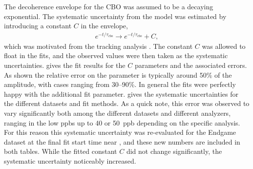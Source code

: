 The decoherence envelope for the CBO was assumed to be a decaying exponential. The systematic uncertainty from the model was estimated by introducing a constant $C$ in the envelope,
    \begin{align}
        e^{-t/\tau_{cbo}} \rightarrow e^{-t/\tau_{cbo}} + C,
    \end{align}
which was motivated from the tracking analysis \cite{phdthesis:2020Kinnaird}. The constant $C$ was allowed to float in the fits, and the observed \DR values were then taken as the systematic uncertainties.  gives the fit results for the $C$ parameters and the associated errors. As shown the relative error on the parameter is typically around 50\% of the amplitude, with cases ranging from 30--90\%. In general the fits were perfectly happy with the additional fit parameter.  gives the systematic uncertainties for the different datasets and fit methods. As a quick note, this error was observed to vary significantly both among the different datasets and different analyzers, ranging in the low ppbs up to 40 or 50~ppb depending on the specific analysis. For this reason this systematic uncertainty was re-evaluated for the Endgame dataset at the final fit start time near , and these new numbers are included in both tables. While the fitted constant $C$ did not change significantly, the systematic uncertainty noticeably increased.


